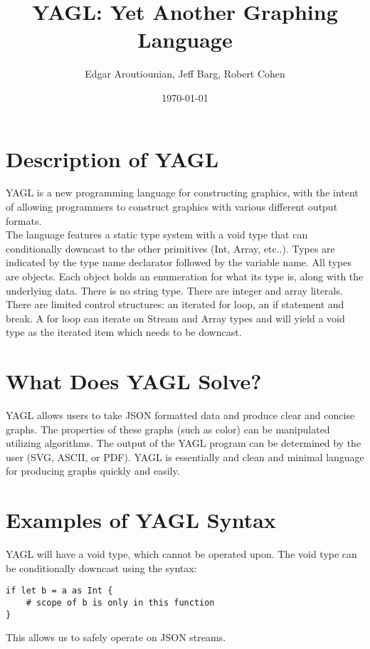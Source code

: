\documentclass[12pt]{article}
\begin{document}
\title{YAGL: Yet Another Graphing Language}
\author{Edgar Aroutiounian, Jeff Barg, Robert Cohen}
\date{\today}
\maketitle


\section{Description of YAGL}
YAGL is a new programming language for constructing graphics, with the intent of allowing programmers to construct graphics with various different output formats.\\

The language features a static type system with a void type that can conditionally downcast to the other primitives (Int, Array, etc..).  Types are indicated by the type name declarator followed by the variable name.  All types are objects.  Each object holds an enumeration for what its type is, along with the underlying data.  There is no string type.  There are integer and array literals.\\

There are limited control structures: an iterated for loop, an if statement and break.  A for loop can iterate on Stream and Array types and will yield a void type as the iterated item which needs to be downcast.

\section{What Does YAGL Solve?}
YAGL allows users to take JSON formatted data and produce clear and concise graphs. The properties of these graphs (such as color) can be manipulated utilizing algorithms. The output of the YAGL program can be determined by the user (SVG, ASCII, or PDF). YAGL is essentially and clean and minimal language for producing graphs quickly and easily.

\section{Examples of YAGL Syntax}
YAGL will have a void type, which cannot be operated upon. The void type can be conditionally downcast using the syntax:
\begin{lstlisting}
if let b = a as Int {
	# scope of b is only in this function 
}
\end{lstlisting}
This allows us to safely operate on JSON streams.\\
\end{document}
